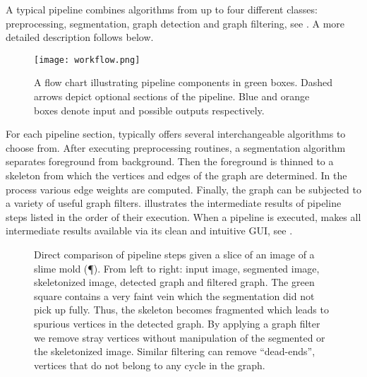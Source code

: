 	A typical pipeline combines algorithms from up to four different classes: preprocessing, segmentation, graph detection and graph filtering, see . A more detailed description follows below. 
	
	\begin{figure}
		\centering
		\texttt{[image: workflow.png]}
		\caption[Pipeline components of \NEFI]{A flow chart illustrating \NEFIs pipeline components in green boxes. Dashed arrows depict optional sections of the pipeline. Blue and orange boxes denote \NEFIs input and possible outputs respectively.}
		\label{fig:workflow}
	\end{figure}

	For each pipeline section, \NEFI typically offers several interchangeable algorithms to choose from. After executing preprocessing routines, a segmentation algorithm separates foreground from background. Then the foreground is thinned to a skeleton from which the vertices and edges of the graph are determined. In the process various edge weights are computed. Finally, the graph can be subjected to a variety of useful graph filters.  illustrates the intermediate results of \NEFIs pipeline steps listed in the order of their execution. When a pipeline is executed, \NEFI makes all intermediate results available via its clean and intuitive GUI, see . 

	\begin{figure}
		\centering
		\quad
		\quad
		\quad
		\quad
		\quad
		\caption[\NEFIs pipeline executed]{Direct comparison of \NEFIs pipeline steps given a slice of an image of a slime mold (\P). From left to right: input image, segmented image, skeletonized image, detected graph and filtered graph. The green square contains a very faint vein which the segmentation did not pick up fully. Thus, the skeleton becomes fragmented which leads to spurious vertices in the detected graph. By applying a graph filter we remove stray vertices without manipulation of the segmented or the skeletonized image. Similar filtering can remove ``dead-ends'', \ie vertices that do not belong to any cycle in the graph.}
		\label{fig:pipeline}
	\end{figure}


